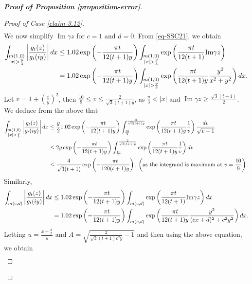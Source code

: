 \documentclass[11pt]{amsart}
\theoremstyle{plain}
\renewcommand{\Im}{\operatorname{Im}}
\numberwithin{equation}{section}
\begin{document}
\begin{proof}[\textbf{\boldmath Proof of Proposition \ref{proposition-error}}]
\begin{proof}[Proof of Case \ref{claim-3.12}]
\begin{align}
			\end{align}
			We now simplify $\Im\gamma z$ for $c = 1$ and $d = 0$. 
			From \eqref{eq-SSC21}, we obtain
			\begin{align}
				\notag
				\int_{\substack{m(1,0)\\|x|>\frac{y}{3}}}\left|\frac{g_{t}(z)}{g_t(iy)}\right|dx &\le 1.02  \exp\left(-\frac{\pi t}{12(t+1)y}\right) \int_{\substack{m(1,0)\\|x|>\frac{y}{3}}}\exp\left(\frac{\pi t}{12(t+1)}\text{Im}\gamma z\right)\\
				\notag
				&=1.02\exp\left(-\frac{\pi t}{12(t+1)y}\right) \int_{\substack{m(1,0)\\|x|>\frac{y}{3}}}\exp\left(\frac{\pi t}{12(t+1)y}\frac{y^{2}}{x^{2}+y^{2}}\right)dx.
			\end{align}
			Let $v = 1 + \left( \frac{x}{y} \right)^{2}$, then
			$\frac{10}{9} \le v \le \frac{2}{\sqrt{3}(t+1)y}$, as $\tfrac{y}{3} < |x|$ and $\operatorname{Im}\gamma z \ge \tfrac{\sqrt{3}(t+1)}{2}$. We deduce from the above that
			\begin{align}\label{eq-SSC24}
				\notag
				\int_{\substack{m(1,0)\\|x|>\frac{y}{3}}}\left|\frac{g_{t}(z)}{g_t(iy)}\right|dx&\le \frac{y}{2}1.02\exp\left(-\frac{\pi t}{12(t+1)y}\right) \int_{\frac{10}{9}}^{\frac{2}{\sqrt{3}(t+1)y}}\exp\left(\frac{\pi t}{12(t+1)y}\frac{1}{v}\right)\frac{dv}{\sqrt{v-1}}\\
				\notag
				&\le 2y\exp\left(-\frac{\pi t}{12(t+1)y}\right) \int_{\frac{10}{9}}^{\frac{2}{\sqrt{3}(t+1)y}}\exp\left(\frac{\pi t}{12(t+1)y}\frac{1}{v}\right)dv\\
				&\le  \frac{4}{\sqrt{3}(t+1)}\exp\left(-\frac{\pi t}{120(t+1)y}\right),\,\left(\text{as the integrand is maximum at $v=\frac{10}{9}$}\right). 
			\end{align}
			Similarly,
			\begin{align*}
				\notag
				\int_{m(c,d)}\left|\frac{g_{t}(z)}{g_t(iy)}\right|dx &\le   1.02\exp\left(-\frac{\pi t}{12(t+1)y}\right) \int_{m(c,d)}\exp\left(\frac{\pi t}{12(t+1)}\text{Im}\gamma z\right)dx\\
				\notag
				&=1.02\exp\left(-\frac{\pi t}{12(t+1)y}\right) \int_{m(c,d)}\exp\left(\frac{\pi t}{12(t+1)y}\frac{y^{2}}{(cx+d)^{2}+c^{2}y^{2}}\right)dx .
			\end{align*}
			Letting $u=\frac{x+\frac{d}{c}}{y}$ and $A=\sqrt{\frac{2}{\sqrt{3}(t+1)c^{2}y}-1}$ and then using the above equation, we obtain 
			\begin{align*}

\end{align*}
\end{proof}
\end{proof}
\end{document}
